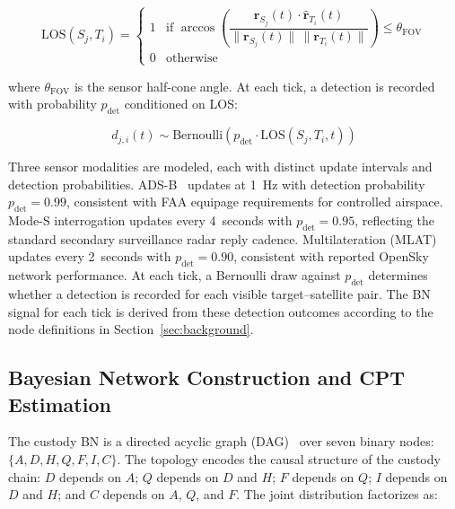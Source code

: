 \documentclass[]{spie}
\begin{document}
\begin{equation}
    \mathrm{LOS}(S_j, T_i) = 
    \begin{cases}
        1 & \text{if } \arccos\!\left(
        \dfrac{\hat{\mathbf{r}}_{S_j}(t) \cdot 
            \hat{\mathbf{r}}_{T_i}(t)}
        {\|\mathbf{r}_{S_j}(t)\|\, 
        \|\mathbf{r}_{T_i}(t)\|}
        \right) \leq \theta_{\mathrm{FOV}} \\[6pt]
        0 & \text{otherwise}
    \end{cases}
    \label{eq:los}
    \end{equation}
    
where $\theta_{\mathrm{FOV}}$ is the sensor half-cone angle. At each tick, a detection 
is recorded with probability $p_{\mathrm{det}}$ conditioned on LOS:

\begin{equation}
    d_{j,i}(t) \sim 
    \mathrm{Bernoulli}(p_{\mathrm{det}} \cdot 
    \mathrm{LOS}(S_j, T_i, t))
    \label{eq:detection}
\end{equation}

Three sensor modalities are modeled, each with distinct update intervals and detection probabilities. ADS-B~\cite{adsb_faa} updates at 1~Hz with detection probability $p_{\mathrm{det}} = 0.99$, consistent with FAA equipage requirements for controlled airspace. Mode-S interrogation updates every 4~seconds with $p_{\mathrm{det}} = 0.95$, reflecting the standard secondary surveillance radar reply cadence. Multilateration (MLAT)~\cite{opensky} updates every 2~seconds with $p_{\mathrm{det}} = 0.90$, consistent with reported OpenSky network performance. At each tick, a Bernoulli draw against $p_{\mathrm{det}}$ determines whether a detection is recorded for each visible target--satellite pair. The BN signal for each tick is derived from these detection outcomes according to the node definitions in Section~\ref{sec:background}.

\subsection{Bayesian Network Construction and CPT Estimation}
\label{sec:bn}

The custody BN is a directed acyclic graph (DAG)~\cite{Pearl1988} over seven binary nodes: $\{A, D, H, Q, F, I, C\}$. The topology encodes the causal structure of the custody chain: $D$ depends on $A$; $Q$ depends on $D$ and $H$; $F$ depends on $Q$; $I$ depends on $D$ and $H$; and $C$ depends on $A$, $Q$, and $F$. The joint distribution factorizes as:
\end{document}
